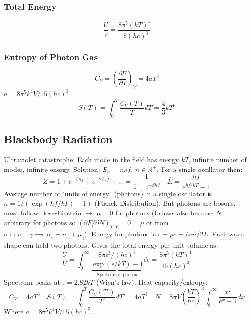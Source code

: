 \documentclass[a4paper,norsk, 10pt]{article}
\newcommand{\pd}[3]{\left(\frac{\partial #1}{\partial #2}\right)_{#3}}
\begin{document}
\subsubsection{Total Energy}
\begin{equation}
\frac{U}{V} = \frac{8\pi^5(kT)^4}{15(hc)^3}
\end{equation}
\subsubsection{Entropy of Photon Gas}
\begin{equation}
C_V = \pd{U}{T}{V} = 4aT^3
\end{equation}
$a = 8\pi^5k^4V/15(hc)^3$
\begin{equation}
S(T) = \int_0^T\frac{C_V(T)}{T}dT = \frac{4}{3}aT^3
\end{equation}
\subsection{Blackbody Radiation}
Ultraviolet catastrophe: Each mode in the field has energy $kT$, infinite number of modes, infinite energy. Solution: $E_n=nhf$, $n\in \mathbb{N}^+$. For a single oscillator then:
\begin{equation}
Z=1+e^{-\beta hf}+e^{-2\beta hf}+...=\frac{1}{1-e^{-\beta hf}}\quad \overline{E}=\frac{hf}{e^{hf/kT}-1}
\end{equation}
Average number of "units of energy" (photons) in a single oscillator is $\overline{n}=1/(\exp(hf/kT)-1)$ (Planck Distribution). But photons are bosons, must follow Bose-Einstein $\rightarrow$ $\mu=0$ for photons (follows also because $N$ arbitrary for photons so $(\partial F/\partial N)_{T,V}=0=\mu$ or from $e\leftrightarrow e+\gamma \implies \mu_e=\mu_e+\mu_{\gamma}$). Energy for photons is $\epsilon=pc=hcn/2L$. Each wave shape can hold two photons. Gives the total energy per unit volume as:
\begin{equation}
\frac{U}{V}=\int_0^{\infty} \underbrace{\frac{8\pi \epsilon^3/(hc)^3}{\exp(\epsilon/kT)-1}}_{\mathrm{Spectrum\ of\ photon}} d\epsilon = \frac{8\pi^5(kT)^4}{15 (hc)^3}
\end{equation}
Spectrum peaks at $\epsilon=2.82 kT$ (Wien's law). Heat capacity/entropy:
\begin{equation}
C_V=4aT^3 \quad S(T)=\int_0^T \frac{C_V(T')}{T'}dT'=4aT^3 \quad N=8\pi V\left(\frac{kT}{hc}\right)^3 \int_0^{\infty} \frac{x^2}{e^x-1}dx
\end{equation}
Where $a=8\pi^5k^4V/15(hc)^3$.
\end{document}

